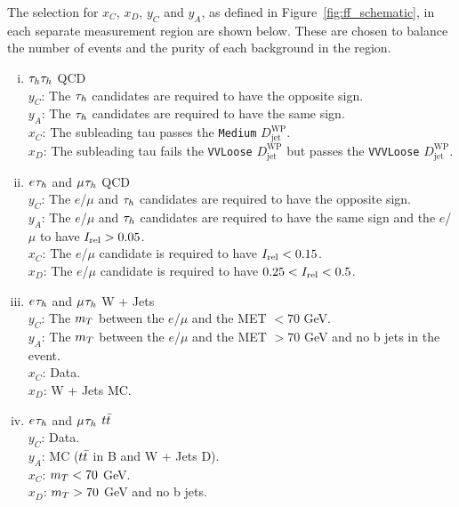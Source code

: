 The selection for $x_C$, $x_D$, $y_C$ and $y_A$, as defined in Figure~\ref{fig:ff_schematic}, in each separate measurement region are shown below.
These are chosen to balance the number of events and the purity of each background in the region.

\begin{enumerate}[i)]
   \item $\tau_{h}\tau_{h}$ QCD \\
     \indent $y_C$: The $\tau_{h}$ candidates are required to have the opposite sign. \\
     \indent $y_A$: The $\tau_{h}$ candidates are required to have the same sign. \\
     \indent $x_C$: The subleading tau passes the \texttt{Medium} $D_{\text{jet}}^{\text{WP}}$. \\
     \indent $x_D$: The subleading tau fails the \texttt{VVLoose} $D_{\text{jet}}^{\text{WP}}$ but passes the \texttt{VVVLoose} $D_{\text{jet}}^{\text{WP}}$.
  \item $e_{}\tau_{h}$ and $\mu_{}\tau_{h}$ QCD \\
    \indent $y_C$: The $e$/$\mu$ and $\tau_{h}$ candidates are required to have the opposite sign. \\
    \indent $y_A$: The $e$/$\mu$ and $\tau_{h}$ candidates are required to have the same sign and the $e$/$\mu$ to have $I_{\text{rel}}>0.05$. \\
    \indent $x_C$: The $e$/$\mu$ candidate is required to have $I_{\text{rel}}<0.15$. \\
    \indent $x_D$: The $e$/$\mu$ candidate is required to have $0.25<I_{\text{rel}}<0.5$.
  \item $e_{}\tau_{h}$ and $\mu_{}\tau_{h}$ W + Jets \\
    \indent $y_C$: The $m_{T}$ between the $e$/$\mu$ and the MET $< 70$ GeV. \\
    \indent $y_A$: The $m_{T}$ between the $e$/$\mu$ and the MET $> 70$ GeV and no b jets in the event. \\
    \indent $x_C$: Data. \\
    \indent $x_D$: W + Jets MC.
  \item $e_{}\tau_{h}$ and $\mu_{}\tau_{h}$ $t\bar{t}$ \\
    \indent $y_C$: Data. \\
    \indent $y_A$: MC ($t\bar{t}$ in B and W + Jets D). \\
    \indent $x_C$: $m_{T} < 70$ GeV. \\
    \indent $x_D$: $m_{T} > 70$ GeV and no b jets. \\
\end{enumerate}


